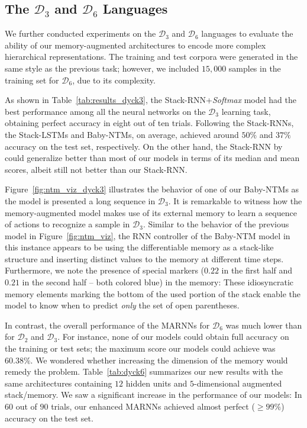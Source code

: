 \documentclass[11pt,a4paper]{article}
\theoremstyle{plain}
\newcommand{\dyck}[1]{\ensuremath{\mathcal{D}_{#1}}}
\begin{document}
\subsection{The \dyck{3} and \dyck{6} Languages}
We further conducted experiments on the \dyck{3} and \dyck{6} languages to evaluate the ability of our memory-augmented architectures to encode more complex hierarchical representations. The training and test corpora were generated in the same style as the previous task; however, we included $15,000$ samples in the training set for \dyck{6}, due to its complexity. 

As shown in Table~\ref{tab:results_dyck3}, the Stack-RNN+\textit{Softmax} model had the best performance among all the neural networks on the \dyck{3} learning task, obtaining perfect accuracy in eight out of ten trials. Following the Stack-RNNs, the Stack-LSTMs and Baby-NTMs, on average, achieved around $50\%$ and $37\%$ accuracy on the test set, respectively. On the other hand, the Stack-RNN by \citet{joulin2015inferring} could generalize better than most of our models in terms of its median and mean scores, albeit still not better than our Stack-RNN.


Figure~\ref{fig:ntm_viz_dyck3} illustrates the behavior of one of our Baby-NTMs as the model is presented a long sequence in \dyck{3}. It is remarkable to witness how the memory-augmented model makes use of its external memory to learn a sequence of actions to recognize a sample in \dyck{3}. Similar to the behavior of the previous model in Figure~\ref{fig:ntm_viz}, the RNN controller of the Baby-NTM model in this instance appears to be using the differentiable memory as a stack-like structure and inserting distinct values to the memory at different time steps. Furthermore, we note the presence of special markers ($0.22$ in the first half and $0.21$ in the second half -- both colored blue) in the memory: These idiosyncratic memory elements marking the bottom of the used portion of the stack enable the model to know when to predict \emph{only} the set of open parentheses. 

In contrast, the overall performance of the MARNNs for \dyck{6} was much lower than for \dyck{2} and \dyck{3}. For instance, none of our models could obtain full accuracy on the training or test sets; the maximum score our models could achieve was $60.38\%$. We wondered whether increasing the dimension of the memory would remedy the problem. Table~\ref{tab:dyck6} summarizes our new results with the same architectures containing $12$ hidden units and $5$-dimensional augmented stack/memory. We saw a significant increase in the performance of our models: In $60$ out of $90$ trials, our enhanced MARNNs achieved almost perfect ($\geq 99\%$) accuracy on the test set.
\end{document}
